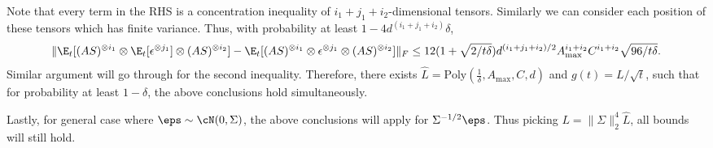Note that every term in the RHS is a concentration inequality of $i_1+j_1+i_2$-dimensional tensors. Similarly we can consider each position of these tensors which has finite variance.
Thus, with probability at least $1- 4d^{(i_1+j_1+i_2)}\delta$,   
\[
\|\E_t[(AS)^{\otimes i_1}\otimes \E_t[\epsilon^{\otimes j_1}] \otimes (AS)^{\otimes i_2}] - \E_t[(AS)^{\otimes i_1}\otimes \epsilon^{\otimes j_1}\otimes (AS)^{\otimes i_2}]  \|_F 
\le
12(1+\sqrt{2/t\delta})d^{(i_1+j_1+i_2)/2}A_{\max}^{i_1+i_2}C^{i_1+i_2}\sqrt{96/t\delta}.  
\]
Similar argument will go through for the second inequality.
Therefore, there exists $\hat{L} = \text{Poly}(\frac{1}{\delta}, A_{\max}, C, d)$ and $g(t) = L/\sqrt{t}$, such that for probability at least $1-\delta$, the above conclusions hold simultaneously.

Lastly, for general case where $\eps\sim {\cN}(0,\Sigma)$, the above conclusions will apply for $\Sigma^{-1/2}\eps$. Thus picking $L = \|\Sigma\|^4_2\hat{L}$, all bounds will still hold. 
